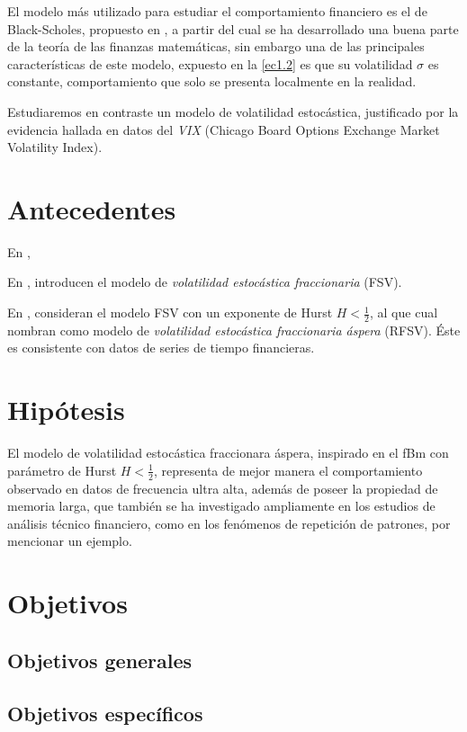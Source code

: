 \documentclass[letterpaper,12pt,oneside]{book}
\theoremstyle{plain}
\numberwithin{theorem}{section}
\begin{document}
El modelo más utilizado para estudiar el comportamiento financiero es el de Black-Scholes, propuesto en \cite{black_pricing_1973-1}, a partir del cual se ha desarrollado una buena parte de la teoría de las finanzas matemáticas, sin embargo una de las principales características de este modelo, expuesto en la \ref{ec1.2} es que su volatilidad $\sigma$ es constante, comportamiento que solo se presenta localmente en la realidad.

Estudiaremos en contraste un modelo de volatilidad estocástica, justificado por la evidencia hallada en datos del \textsl{VIX} (Chicago Board Options Exchange Market Volatility Index).
\section*{Antecedentes}
En \cite{mandelbrot_fractional_1968},

En \cite{comte_long_1998}, introducen el modelo de \textsl{volatilidad estocástica fraccionaria} (FSV).

En \cite{gatheral_volatility_2018}, consideran el modelo FSV con un exponente de Hurst $H<\frac{1}{2}$, al que cual nombran como modelo de \textsl{volatilidad estocástica fraccionaria áspera} (RFSV). Éste es consistente con datos de series de tiempo financieras.
\section*{Hipótesis}
El modelo de volatilidad estocástica fraccionara áspera, inspirado en el fBm con parámetro de Hurst $H<\frac{1}{2}$, representa de mejor manera el comportamiento observado en datos de frecuencia ultra alta, además de poseer la propiedad de memoria larga, que también se ha investigado ampliamente en los estudios de análisis técnico financiero, como en los fenómenos de repetición de patrones, por mencionar un ejemplo.
\section*{Objetivos}
\subsection*{Objetivos generales}
\subsection*{Objetivos específicos}
\end{document}
